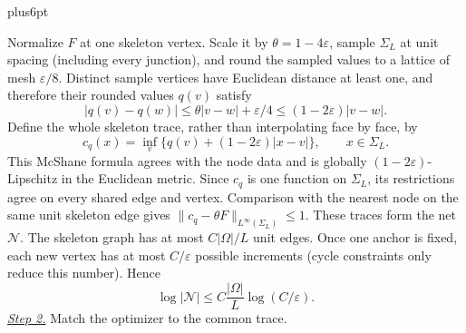 \documentclass[11pt,reqno]{amsart}
\makeatletter
\theoremstyle{plain}
\theoremstyle{definition}
\theoremstyle{remark}
\renewenvironment{proof}[1][\proofname]{%
  \par
  \pushQED{\qed}%
  \normalfont
  \topsep6pt plus6pt\relax
  \trivlist
  \item[\hskip\labelsep\slshape #1\@addpunct{.}]%
  \ignorespaces
}{%
  \popQED
  \endtrivlist
  \@endpefalse
}
\DeclareRobustCommand{\qed}{%
  \leavevmode\unskip\penalty9999\hbox{}\nobreak
  \ifmmode
    \makebox[0pt][l]{\qquad\hbox{\qedsymbol}}%
  \else
    \qquad\hbox{\qedsymbol}%
  \fi
}
\renewcommand{\qedsymbol}{\rule[.47pt]{4pt}{6pt}}
\numberwithin{equation}{section}
\newcommand{\1}{\mathbf 1}
\makeatother
\begin{document}
\begin{proof}
Normalize $F$ at one skeleton vertex.  Scale it by
$\theta=1-4\varepsilon$, sample $\Sigma_ L$ at unit spacing (including
every junction), and round the sampled values to a lattice of mesh
$\varepsilon/8$.  Distinct sample vertices have Euclidean distance at
least one, and therefore their rounded values $q(v)$ satisfy
\begin{equation*}
|q(v)-q(w)|\leq\theta|v-w|+\varepsilon/4
\leq(1-2\varepsilon)|v-w|.
\end{equation*}
Define the whole skeleton trace, rather than interpolating face by face, by
\begin{equation}
c_ q(x)=\inf_ v\{q(v)+(1-2\varepsilon)|x-v|\},
\qquad x\in\Sigma_ L.
\tag{20a}
\end{equation}
This McShane formula agrees with the node data and is globally
$(1-2\varepsilon)$-Lipschitz in the Euclidean metric.  Since $c_q$ is
one function on $\Sigma_L$, its restrictions agree on every shared edge
and vertex.  Comparison with the nearest node on the same unit skeleton
edge gives
$\|c_ q-\theta F\|_ {L^\infty(\Sigma_ L)}\leq1$.
These traces form the net $\mathcal N$.
The skeleton graph has at most $C|\Omega|/L$ unit edges.  Once one
anchor is fixed, each new vertex has at most $C/\varepsilon$ possible
increments (cycle constraints only reduce this number).  Hence
\begin{equation}
\log|\mathcal N|
\leq C\frac{|\Omega|}{L}\log(C/\varepsilon).
\tag{21}
\end{equation}
\smallskip\noindent
\underline{\textit{Step 2.}} Match the optimizer to the common trace.


\end{proof}
\end{document}
